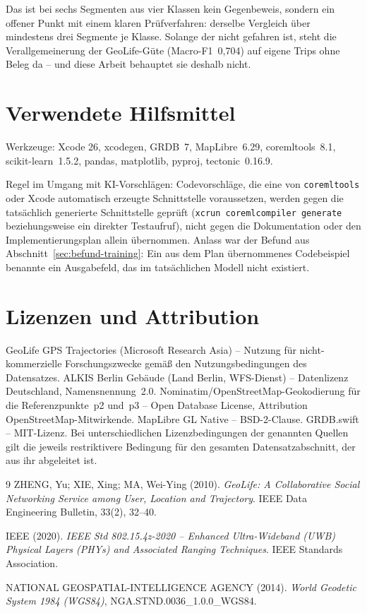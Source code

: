 \documentclass[11pt,a4paper,oneside]{article}
\begin{document}
Das ist bei sechs Segmenten aus vier Klassen kein Gegenbeweis, sondern ein
offener Punkt mit einem klaren Prüfverfahren: derselbe Vergleich über
mindestens drei Segmente je Klasse. Solange der nicht gefahren ist, steht
die Verallgemeinerung der GeoLife-Güte (Macro-F1~0{,}704) auf eigene Trips
ohne Beleg da -- und diese Arbeit behauptet sie deshalb nicht.

\section{Verwendete Hilfsmittel}

Werkzeuge: Xcode 26, xcodegen, GRDB~7, MapLibre~6.29, coremltools~8.1,
scikit-learn~1.5.2, pandas, matplotlib, pyproj, tectonic~0.16.9.

Regel im Umgang mit KI-Vorschlägen: Codevorschläge, die eine von
\texttt{coremltools} oder Xcode automatisch erzeugte Schnittstelle
voraussetzen, werden gegen die tatsächlich generierte Schnittstelle
geprüft (\texttt{xcrun coremlcompiler generate} beziehungsweise ein
direkter Testaufruf), nicht gegen die Dokumentation oder den
Implementierungsplan allein übernommen. Anlass war der Befund aus
Abschnitt~\ref{sec:befund-training}: Ein aus dem Plan übernommenes
Codebeispiel benannte ein Ausgabefeld, das im tatsächlichen Modell nicht
existiert.

\section*{Lizenzen und Attribution}

GeoLife GPS Trajectories (Microsoft Research Asia) -- Nutzung für
nicht-kommerzielle Forschungszwecke gemäß den Nutzungsbedingungen des
Datensatzes. ALKIS Berlin Gebäude (Land Berlin, WFS-Dienst) -- Datenlizenz
Deutschland, Namensnennung~2.0. Nominatim/OpenStreetMap-Geokodierung für
die Referenzpunkte~p2 und~p3 -- Open Database License, Attribution
\textcopyright{} OpenStreetMap-Mitwirkende. MapLibre GL Native -- BSD-2-Clause.
GRDB.swift -- MIT-Lizenz. Bei unterschiedlichen Lizenzbedingungen der
genannten Quellen gilt die jeweils restriktivere Bedingung für den
gesamten Datensatzabschnitt, der aus ihr abgeleitet ist.

\begin{thebibliography}{9}
ZHENG, Yu; XIE, Xing; MA, Wei-Ying (2010).
\textit{GeoLife: A Collaborative Social Networking Service among User,
Location and Trajectory}. IEEE Data Engineering Bulletin, 33(2), 32--40.

IEEE (2020).
\textit{IEEE Std 802.15.4z-2020 -- Enhanced Ultra-Wideband (UWB) Physical
Layers (PHYs) and Associated Ranging Techniques}. IEEE Standards
Association.

NATIONAL GEOSPATIAL-INTELLIGENCE AGENCY (2014).
\textit{World Geodetic System 1984 (WGS84)}, NGA.STND.0036\_1.0.0\_WGS84.
\end{thebibliography}
\end{document}
